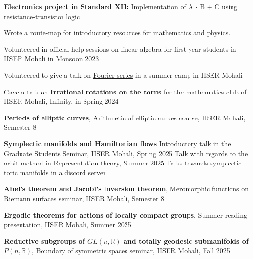 \documentclass{LoLaTeXcv}
\begin{document}

\lltxSubSection{}


\begin{lltxItemize}
	\item \textbf{Electronics project in Standard XII:} Implementation of A $\cdot$ B + C using resistance-transistor logic
	\item \href{https://rupadarshiray.github.io/academia/inculcation}{Wrote a route-map for introductory resources for mathematics and physics.}
	\item Volunteered in official help sessions on linear algebra for first year students in IISER Mohali in Monsoon 2023
	\item Volunteered to give a talk on \href{https://ggl.link/fourier}{Fourier series} in a summer camp in IISER Mohali
\end{lltxItemize}


\begin{lltxItemize}
	\item Gave a talk on \textbf{Irrational rotations on the torus} for the mathematics club of IISER Mohali, Infinity, in Spring 2024
	\item \textbf{Periods of elliptic curves}, Arithmetic of elliptic curves course, IISER Mohali, Semester 8
	\item \textbf{Symplectic manifolds and Hamiltonian flows}
		\subitem \href{https://ggl.link/hamiltonian}{Introductory talk} in the \href{https://web.iisermohali.ac.in/dept/math/seminars/gsg/}{Graduate Students Seminar, IISER Mohali}, Spring 2025
		\subitem \href{https://dub.sh/qofhamil}{Talk with regards to the orbit method in Representation theory}, Summer 2025
		\subitem \href{https://dub.sh/symplectictoric}{Talks towards symplectic toric manifolds} in a discord server
	\item \textbf{Abel's theorem and Jacobi's inversion theorem}, Meromorphic functions on Riemann surfaces seminar, IISER Mohali, Semester 8
	\item \textbf{Ergodic theorems for actions of locally compact groups}, Summer reading presentation, IISER Mohali, Summer 2025
	\item \textbf{Reductive subgroups of $GL(n,\mathbb{R})$ and totally geodesic submanifolds of $P(n,\mathbb{R})$}, Boundary of symmetric spaces seminar, IISER Mohali, Fall 2025
\end{lltxItemize}
\end{document}
